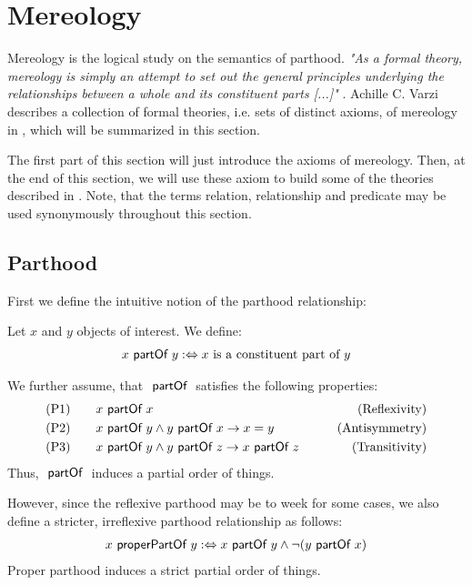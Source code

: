 \section{Mereology}
\label{section:Mereology}
Mereology is the logical study on the semantics of parthood.
\textit{"As a formal theory, mereology is simply
an attempt to set out the general principles underlying the relationships between a whole and its constituent parts [...]"} \cite{DBLP:journals/dke/Varzi96}.
Achille C. Varzi describes a collection of formal theories, i.e. sets of distinct axioms, of mereology in \cite{DBLP:journals/dke/Varzi96}, which will be summarized in this section.

The first part of this section will just introduce the axioms of mereology.
Then, at the end of this section, we will use these axiom to build some of the theories described in \cite{DBLP:journals/dke/Varzi96}.
Note, that the terms relation, relationship and predicate may be used synonymously throughout this section.


\subsection{Parthood}
\label{subsection:Parthood}
First we define the intuitive notion of the parthood relationship:
\begin{definition}[$\partOf$]
Let $x$ and $y$ objects of interest.
We define:
\begin{align}
x ~\textsf{partOf}~ y
:\Leftrightarrow
x \text{ is a constituent part of } y
\end{align}
\end{definition}
We further assume, that $\partOf$ satisfies the following properties:
\begin{align}
&\text{(P1)}
\qquad x ~\textsf{partOf}~ x 
&\qquad \text{(Reflexivity)}
\\
&\text{(P2)}
\qquad x ~\textsf{partOf}~ y \wedge y ~\textsf{partOf}~ x \rightarrow x = y
&\qquad \text{(Antisymmetry)}
\\
&\text{(P3)}
\qquad x ~\textsf{partOf}~ y \wedge y ~\textsf{partOf}~ z \rightarrow x ~\textsf{partOf}~ z
&\qquad \text{(Transitivity)}
\end{align}
Thus, $\partOf$ induces a partial order of things.

However, since the reflexive parthood may be to week for some cases, we also define a stricter, irreflexive parthood relationship as follows:
\begin{align}
x ~\textsf{properPartOf}~ y
:\Leftrightarrow
x ~\textsf{partOf}~ y \wedge \neg(y ~\textsf{partOf}~ x)
\end{align}
Proper parthood induces a strict partial order of things.


